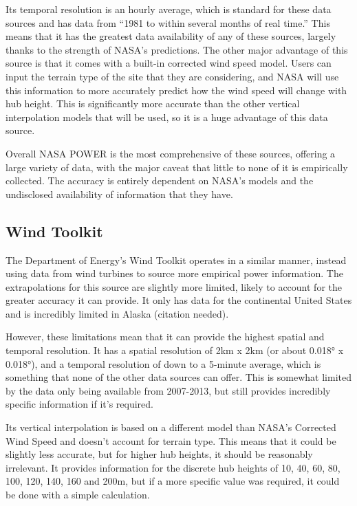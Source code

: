 \documentclass[12pt, oneside]{article}   	%
\begin{document}
Its temporal resolution is an hourly average, which is standard for these data
sources and has data from “1981 to within several months of real
time.”\cite{NASA-POWER-METHODOLOGY}  This means that it has the greatest data
availability of any of these sources, largely thanks to the strength of NASA's
predictions. The other major advantage of this source is that it comes with a
built-in corrected wind speed model. \cite{NASA-POWER-SPEED} Users can input the
terrain type of the site that they are considering, and NASA will use this
information to more accurately predict how the wind speed will change with hub
height. This is significantly more accurate than the other vertical
interpolation models that will be used, so it is a huge advantage of this data
source.

Overall NASA POWER is the most comprehensive of these sources, offering a large
variety of data, with the major caveat that little to none of it is empirically
collected. The accuracy is entirely dependent on NASA's models and the
undisclosed availability of information that they have.

\subsection{Wind Toolkit}

The Department of Energy's Wind Toolkit operates in a similar manner, instead
using data from wind turbines to source more empirical power
information.\cite{WIND-PAPER} The extrapolations for this source are slightly
more limited, likely to account for the greater accuracy it can provide. It only
has data for the continental United States and is incredibly limited in Alaska
(citation needed).

However, these limitations mean that it can provide the highest spatial and
temporal resolution. It has a spatial resolution of 2km x 2km (or about 0.018° x
0.018°), and a temporal resolution of down to a 5-minute average, which is
something that none of the other data sources can offer. This is somewhat
limited by the data only being available from 2007-2013, but still provides
incredibly specific information if it's required.

Its vertical interpolation is based on a different model than NASA's Corrected
Wind Speed and doesn't account for terrain type. This means that it could be
slightly less accurate, but for higher hub heights, it should be reasonably
irrelevant. It provides information for the discrete hub heights of 10, 40, 60,
80, 100, 120, 140, 160 and 200m, but if a more specific value was required, it
could be done with a simple calculation.
\end{document}

